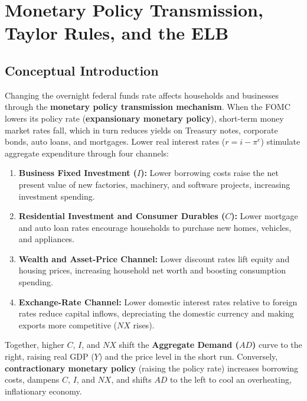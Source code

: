 \documentclass[11pt, a4paper]{article}
\begin{document}
\section{Monetary Policy Transmission, Taylor Rules, and the ELB}

\subsection*{Conceptual Introduction}
Changing the overnight federal funds rate affects households and businesses through the \textbf{monetary policy transmission mechanism}. When the FOMC lowers its policy rate (\textbf{expansionary monetary policy}), short-term money market rates fall, which in turn reduces yields on Treasury notes, corporate bonds, auto loans, and mortgages. Lower real interest rates ($r = i - \pi^e$) stimulate aggregate expenditure through four channels:
\begin{enumerate}[leftmargin=1.4em, itemsep=0.25em]
  \item \textbf{Business Fixed Investment ($I$):} Lower borrowing costs raise the net present value of new factories, machinery, and software projects, increasing investment spending.
  \item \textbf{Residential Investment and Consumer Durables ($C$):} Lower mortgage and auto loan rates encourage households to purchase new homes, vehicles, and appliances.
  \item \textbf{Wealth and Asset-Price Channel:} Lower discount rates lift equity and housing prices, increasing household net worth and boosting consumption spending.
  \item \textbf{Exchange-Rate Channel:} Lower domestic interest rates relative to foreign rates reduce capital inflows, depreciating the domestic currency and making exports more competitive ($NX$ rises).
\end{enumerate}

Together, higher $C$, $I$, and $NX$ shift the \textbf{Aggregate Demand ($AD$)} curve to the right, raising real GDP ($Y$) and the price level in the short run. Conversely, \textbf{contractionary monetary policy} (raising the policy rate) increases borrowing costs, dampens $C$, $I$, and $NX$, and shifts $AD$ to the left to cool an overheating, inflationary economy.
\end{document}
